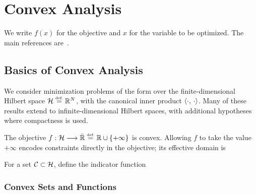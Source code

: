 
\chapter{Convex Analysis}
\label{chap-convex-optim}


We write $f(x)$ for the objective and $x$ for the variable to be optimized. The main references are~\cite{ciarlet1982introduction,boyd2004convex}.


\section{Basics of Convex Analysis}

We consider minimization problems of the form
over the finite-dimensional Hilbert space $\mathcal{H} \stackrel{\mbox{\upshape\tiny def.}}{=} \mathbb{R}^N$, with the canonical inner product $\langle \cdot,\,\cdot\rangle$.
%
Many of these results extend to infinite-dimensional Hilbert spaces, with additional hypotheses where compactness is used.

The objective $f : \mathcal{H} \longrightarrow \bar {\mathbb{R}} \stackrel{\mbox{\upshape\tiny def.}}{=} \mathbb{R} \cup \{+\infty\}$ is convex. Allowing $f$ to take the value $+\infty$ encodes constraints directly in the objective; its effective domain is

For a set $\mathcal{C} \subset \mathcal{H}$, define the indicator function


\subsection{Convex Sets and Functions}

